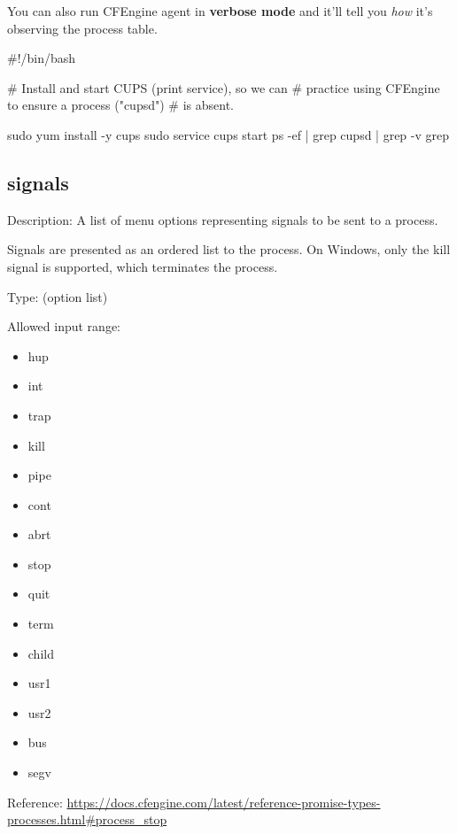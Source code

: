 You can also run CFEngine agent in \textbf{verbose mode} and it'll tell you
\emph{how} it's observing the process table.

\begin{codelisting}
\begin{code}
#!/bin/bash

# Install and start CUPS (print service), so we can
# practice using CFEngine to ensure a process ("cupsd")
# is absent.

sudo yum install -y cups
sudo service cups start
ps -ef | grep cupsd | grep -v grep
\end{code}
\end{codelisting}





\subsection{signals}

Description: A list of menu options representing signals to be sent to a process.

Signals are presented as an ordered list to the process. On Windows, only the kill signal is supported, which terminates the process.

Type: (option list)

Allowed input range:

\begin{itemize}
\item{} hup
\item{} int
\item{} trap
\item{} kill
\item{} pipe
\item{} cont
\item{} abrt
\item{} stop
\item{} quit
\item{} term
\item{} child
\item{} usr1
\item{} usr2
\item{} bus
\item{} segv
\end{itemize}

Reference: \href{https://docs.cfengine.com/latest/reference-promise-types-processes.html#process_stop}{https://docs.cfengine.com/latest/reference-promise-types-processes.html\#process\_stop}

